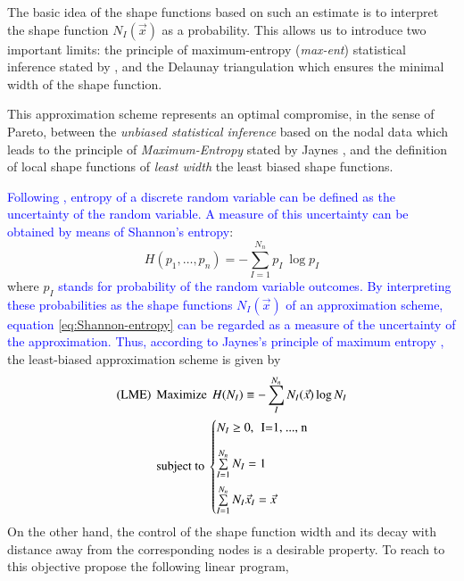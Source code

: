 \documentclass[preprint,12pt,a4paper]{elsarticle}
\begin{document}
The basic idea of the shape functions based on such an estimate is to interpret the shape function $N_I(\vec{x})$ as a probability. This allows us to introduce two important limits:
the principle of maximum-entropy (\textit{max-ent}) statistical
inference stated by \cite{Jaynes1957}, and the Delaunay triangulation
which ensures the minimal width of the shape function. 

This approximation scheme represents an optimal compromise, in the sense of
Pareto, between the \textit{unbiased statistical inference} based on
the nodal data which leads to the principle of \textit{Maximum-Entropy}
stated by Jaynes \cite{Jaynes1957}, and the definition of local shape
functions of \textit{least width} the least biased shape functions.

\textcolor{blue}{Following \cite{Arroyo2006}, entropy of a discrete random variable can be defined as the uncertainty of the random variable. A measure of this uncertainty can be obtained by means of Shannon's entropy}:
\begin{equation}
  \label{eq:Shannon-entropy}
  H(p_1,\ldots,p_n) = -\sum^{N_n}_{I=1}{p_I\ \log p_I }
\end{equation}
where $p_I$ \textcolor{blue}{stands for probability of the random variable outcomes. By interpreting these probabilities as the shape functions $N_I(\vec{x})$ of an approximation scheme, equation \eqref{eq:Shannon-entropy} can be regarded as a measure of the uncertainty of the approximation. Thus, according to Jaynes's principle of maximum entropy \cite{Jaynes1957},} the least-biased approximation scheme is
given by
\begin{align*}
  \label{eq:least-biased-approximation-scheme}
  \text{(LME)} \hspace{0.15cm} &\text{Maximize} \hspace{0.15cm} H(N_I) \equiv
  -\sum_{I}^{N_n}{N_I(\vec{x})\log N_I }\\
  &\text{subject to}\
  \begin{cases}
    N_I \ge 0, \hspace{0.15cm} \text{I=1, ..., n} \\[1em]   
    \sum\limits_{I=1}^{N_n}{N_I} = 1 \\[1em]   
    \sum\limits_{I=1}^{N_n}{N_I \vec{x}_I} = \vec{x} \\
  \end{cases}
\end{align*}
On the other hand, the control of the shape function width and its
decay with distance away from the corresponding nodes is a desirable property. To reach to this objective \cite{Arroyo2006} propose the following linear program,
\end{document}
